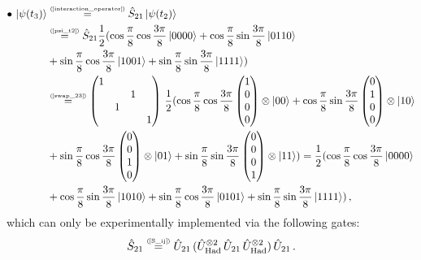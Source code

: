 \documentclass[11pt]{article}
\numberwithin{equation}{section} %
\numberwithin{figure}{section} %
\newcommand\numeq[1] %
  {\stackrel{\scriptscriptstyle(\mkern-1.5mu#1\mkern-1.5mu)}{=}}
\begin{document}
\begin{appendices}
\begin{equation} \label{psi_t3}
\begin{split}
\bullet\,\ket{\psi(t_3)}
&	\numeq{\textrm{\ref{interaction_operator}}} \hat{S}_{21}\ket{\psi(t_2)}\\
&	\numeq{\textrm{\ref{psi_t2}}} \hat{S}_{21}\frac{1}{2} (\cos\frac{\pi}{8}\cos\frac{3\pi}{8}\ket{0000} + \cos\frac{\pi}{8}\sin\frac{3\pi}{8}\ket{0110}\\
&	+\sin\frac{\pi}{8}\cos\frac{3\pi}{8}\ket{1001} +\sin\frac{\pi}{8}\sin\frac{3\pi}{8}\ket{1111})\\
&	\numeq{\textrm{\ref{swap_23}}} \begin{pmatrix}1&&&\\ &&1&\\ &1&&\\ &&&1\end{pmatrix}\, \frac{1}{2} (\cos\frac{\pi}{8}\cos\frac{3\pi}{8}\begin{pmatrix}1\\ 0\\ 0\\ 0\\ \end{pmatrix}\otimes\ket{00} + \cos\frac{\pi}{8}\sin\frac{3\pi}{8}\begin{pmatrix}0\\ 1\\ 0\\ 0\\ \end{pmatrix}\otimes\ket{10}\\
&	+\sin\frac{\pi}{8}\cos\frac{3\pi}{8}\begin{pmatrix}0\\ 0\\ 1\\ 0\\ \end{pmatrix}\otimes\ket{01} +\sin\frac{\pi}{8}\sin\frac{3\pi}{8}\begin{pmatrix}0\\ 0\\ 0\\ 1\\ \end{pmatrix}\otimes\ket{11}) = \frac{1}{2} (\cos\frac{\pi}{8}\cos\frac{3\pi}{8}\ket{0000}\\
&+ \cos\frac{\pi}{8}\sin\frac{3\pi}{8}\ket{1010} +\sin\frac{\pi}{8}\cos\frac{3\pi}{8}\ket{0101} +\sin\frac{\pi}{8}\sin\frac{3\pi}{8}\ket{1111})\,,
\end{split}
\end{equation}
which can only be experimentally implemented via the following gates: 
\begin{equation}
\hat{S}_{21} \numeq{\textrm{\ref{S_ij}}} \hat{U}_{21}\,(\hat{U}_{\textrm{Had}}^{\otimes 2}\,\hat{U}_{21}\,\hat{U}_{\textrm{Had}}^{\otimes 2})\,\hat{U}_{21}\,.
\end{equation}


\end{appendices}
\end{document}
